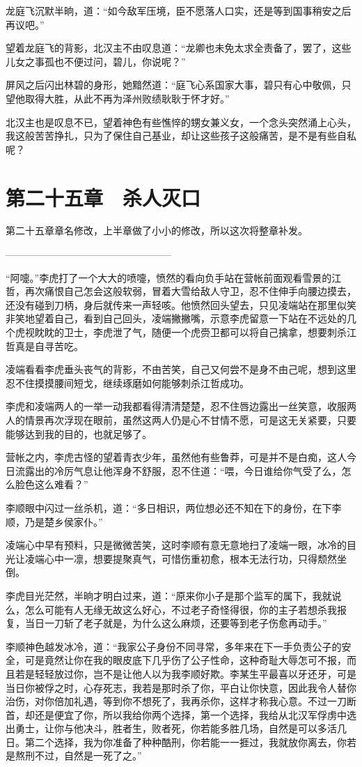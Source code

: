 龙庭飞沉默半晌，道：“如今敌军压境，臣不愿落人口实，还是等到国事稍安之后再议吧。”

望着龙庭飞的背影，北汉主不由叹息道：“龙卿也未免太求全责备了，罢了，这些儿女之事孤也不便过问，碧儿，你说呢？”

屏风之后闪出林碧的身形，她黯然道：“庭飞心系国家大事，碧只有心中敬佩，只望他取得大胜，从此不再为泽州败绩耿耿于怀才好。”

北汉主也是叹息不已，望着神色有些憔悴的甥女兼义女，一个念头突然涌上心头，我这般苦苦挣扎，只为了保住自己基业，却让这些孩子这般痛苦，是不是有些自私呢？

\chapter{第二十五章　杀人灭口}

第二十五章章名修改，上半章做了小小的修改，所以这次将整章补发。

—————————————————

“阿嚏。”李虎打了一个大大的喷嚏，愤然的看向负手站在营帐前面观看雪景的江哲，再次痛恨自己怎会这般软弱，冒着大雪给敌人守卫，忍不住伸手向腰边摸去，还没有碰到刀柄，身后就传来一声轻咳。他愤然回头望去，只见凌端站在那里似笑非笑地望着自己，看到自己回头，凌端撇撇嘴，示意李虎留意一下站在不远处的几个虎视眈眈的卫士，李虎泄了气，随便一个虎赍卫都可以将自己擒拿，想要刺杀江哲真是自寻苦吃。

凌端看看李虎垂头丧气的背影，不由苦笑，自己又何尝不是身不由己呢，想到这里忍不住摸摸腰间短戈，继续琢磨如何能够刺杀江哲成功。

李虎和凌端两人的一举一动我都看得清清楚楚，忍不住唇边露出一丝笑意，收服两人的情景再次浮现在眼前，虽然这两人仍是心不甘情不愿，可是这无关紧要，只要能够达到我的目的，也就足够了。

营帐之内，李虎古怪的望着青衣少年，虽然他有些鲁莽，可是并不是白痴，这人今日流露出的冷厉气息让他浑身不舒服，忍不住道：“喂，今日谁给你气受了么，怎么脸色这么难看？”

李顺眼中闪过一丝杀机，道：“多日相识，两位想必还不知在下的身份，在下李顺，乃是楚乡侯家仆。”

凌端心中早有预料，只是微微苦笑，这时李顺有意无意地扫了凌端一眼，冰冷的目光让凌端心中一凛，想要提聚真气，可惜伤重初愈，根本无法行功，只得颓然坐倒。

李虎目光茫然，半晌才明白过来，道：“原来你小子是那个监军的属下，我就说么，怎么可能有人无缘无故这么好心，不过老子奇怪得很，你的主子若想杀我报复，当日一刀斩了老子就是，为什么这么麻烦，还要等到老子伤愈再动手。”

李顺神色越发冰冷，道：“我家公子身份不同寻常，多年来在下一手负责公子的安全，可是竟然让你在我的眼皮底下几乎伤了公子性命，这种奇耻大辱怎可不报，而且若是轻轻放过你，岂不是让他人以为我李顺好欺。李某生平最喜以牙还牙，可是当日你被俘之时，心存死志，我若是那时杀了你，平白让你快意，因此我令人替你治伤，对你倍加礼遇，等到你不想死了，我再杀你，这样才称我心意。不过一刀断首，却还是便宜了你，所以我给你两个选择，第一个选择，我给从北汉军俘虏中选出勇士，让你与他决斗，胜者生，败者死，你若能多胜几场，自然是可以多活几日。第二个选择，我为你准备了种种酷刑，你若能一一捱过，我就放你离去，你若是熬刑不过，自然是一死了之。”

